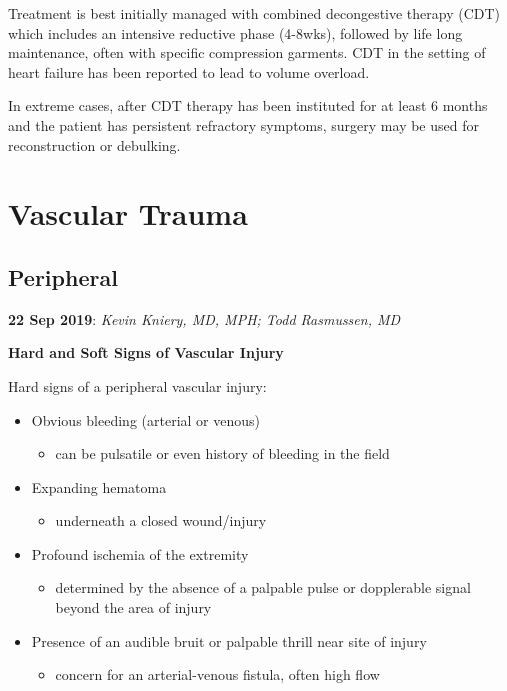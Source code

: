 \documentclass[
]{book}
\providecommand{\tightlist}{%
  \setlength{\itemsep}{0pt}\setlength{\parskip}{0pt}}
\begin{document}
Treatment is best initially managed with combined decongestive therapy
(CDT) which includes an intensive reductive phase (4-8wks), followed by
life long maintenance, often with specific compression
garments.\citep{grada2017} CDT in the setting of heart failure has been
reported to lead to volume overload.\citep{lawenda2009}

In extreme cases, after CDT therapy has been instituted for at least 6
months and the patient has persistent refractory symptoms, surgery may
be used for reconstruction or debulking.\citep{grada2017, baumeister2016}

\hypertarget{vascular-trauma}{%
\chapter{Vascular Trauma}\label{vascular-trauma}}

\hypertarget{peripheral}{%
\section{Peripheral}\label{peripheral}}

\textbf{22 Sep 2019}: \emph{Kevin Kniery, MD, MPH; Todd Rasmussen, MD}

\textbf{Hard and Soft Signs of Vascular Injury}

Hard signs of a peripheral vascular injury:

\begin{itemize}
\item
  Obvious bleeding (arterial or venous)

  \begin{itemize}
  \tightlist
  \item
    can be pulsatile or even history of bleeding in the field
  \end{itemize}
\item
  Expanding hematoma

  \begin{itemize}
  \tightlist
  \item
    underneath a closed wound/injury
  \end{itemize}
\item
  Profound ischemia of the extremity

  \begin{itemize}
  \tightlist
  \item
    determined by the absence of a palpable pulse or dopplerable
    signal beyond the area of injury
  \end{itemize}
\item
  Presence of an audible bruit or palpable thrill near site of injury

  \begin{itemize}
  \tightlist
  \item
    concern for an arterial-venous fistula, often high flow
  \end{itemize}
\end{itemize}
\end{document}

